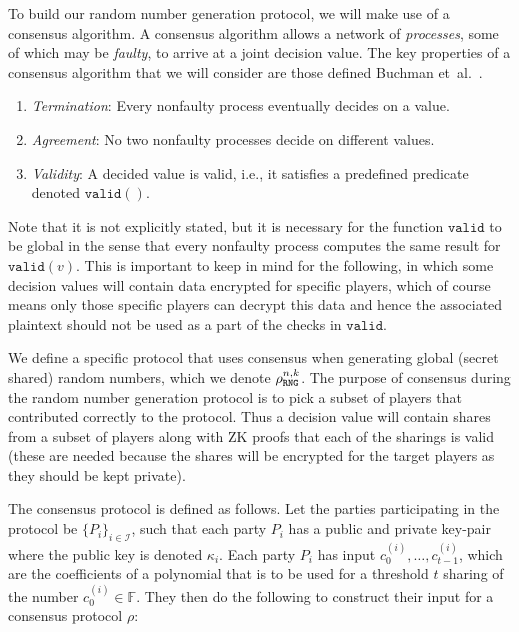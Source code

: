 \documentclass{article}
\theoremstyle{remark}
\newcommand{\F}{\mathbb{F}}
\begin{document}
To build our random number generation protocol, we will make use of a consensus
algorithm. A consensus algorithm allows a network of \textit{processes}, some
of which may be \textit{faulty}, to arrive at a joint decision value. The key
properties of a consensus algorithm that we will consider are those defined
Buchman et~al.~\cite{buchman_2018}.

\begin{enumerate}
	\item \textit{Termination}: Every nonfaulty process eventually decides on a
		value.
	\item \textit{Agreement}: No two nonfaulty processes decide on different
		values.
	\item \textit{Validity}: A decided value is valid, i.e., it satisfies a
		predefined predicate denoted $\texttt{valid}()$.
\end{enumerate}

Note that it is not explicitly stated, but it is necessary for the function
$\texttt{valid}$ to be global in the sense that every nonfaulty process
computes the same result for $\texttt{valid}(v)$. This is important to keep in
mind for the following, in which some decision values will contain data
encrypted for specific players, which of course means only those specific
players can decrypt this data and hence the associated plaintext should not be
used as a part of the checks in $\texttt{valid}$.

We define a specific protocol that uses consensus when generating global
(secret shared) random numbers, which we denote $\rho_\texttt{RNG}^{n, k}$. The purpose
of consensus during the random number generation protocol is to pick a subset
of players that contributed correctly to the protocol. Thus a decision value
will contain shares from a subset of players along with ZK proofs that each of
the sharings is valid (these are needed because the shares will be encrypted
for the target players as they should be kept private).

The consensus protocol is defined as follows. Let the parties participating in
the protocol be ${\{P_i\}}_{i \in \mathcal{I}}$, such that each party $P_i$ has
a public and private key-pair where the public key is denoted $\kappa_i$. Each
party $P_i$ has input $c_0^{(i)}, \ldots, c_{t-1}^{(i)}$, which are the
coefficients of a polynomial that is to be used for a threshold $t$ sharing of
the number $c_0^{(i)} \in \F$. They then do the following to construct their
input for a consensus protocol $\rho$:
\end{document}
